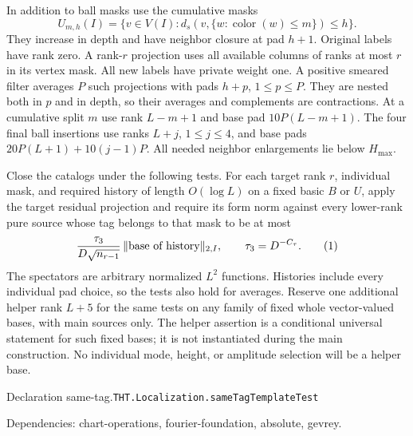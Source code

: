 \documentclass[11pt]{article}
\theoremstyle{definition}
\newcommand{\eqtag}[1]{\refstepcounter{equation}\tag{\theequation}\label{#1}}
\numberwithin{equation}{section}
\newcommand{\bp}[3]{\par\smallskip\begingroup\footnotesize
\noindent\hypertarget{bp:#1}{\textsf{Declaration #1.}}\quad\nolinkurl{#2}\par
\noindent\textsf{Dependencies:} #3.\par\endgroup\smallskip}
\begin{document}
In addition to ball masks use the cumulative masks
\[
 U_{m,h}(I)=\{v\in V(I):d_s(v,\{w:\operatorname{color}(w)\le m\})\le h\}.
\]
They increase in depth and have neighbor closure at pad $h+1$. Original labels have rank zero. A rank-$r$ projection uses all available columns of ranks at most $r$ in its vertex mask. All new labels have private weight one. A positive smeared filter averages $P$ such projections with pads $h+p$, $1\le p\le P$. They are nested both in $p$ and in depth, so their averages and complements are contractions. At a cumulative split $m$ use rank $L-m+1$ and base pad $10P(L-m+1)$. The four final ball insertions use ranks $L+j$, $1\le j\le4$, and base pads $20P(L+1)+10(j-1)P$. All needed neighbor enlargements lie below $H_{\max}$.

Close the catalogs under the following tests. For each target rank $r$, individual mask, and required history of length $O(\log L)$ on a fixed basic $B$ or $U$, apply the target residual projection and require its form norm against every lower-rank pure source whose tag belongs to that mask to be at most
\[
 \frac{\tau_3}{D\sqrt{n_{r-1}}}\,\|\text{base of history}\|_{2,I},
 \qquad \tau_3=D^{-C_\tau}.
 \eqtag{eq:catalog-test}
\]
The spectators are arbitrary normalized $L^2$ functions. Histories include every individual pad choice, so the tests also hold for averages. Reserve one additional helper rank $L+5$ for the same tests on any family of fixed whole vector-valued bases, with main sources only. The helper assertion is a conditional universal statement for such fixed bases; it is not instantiated during the main construction. No individual mode, height, or amplitude selection will be a helper base.

\bp{same-tag}{THT.Localization.sameTagTemplateTest}{chart-operations, fourier-foundation, absolute, gevrey}
\end{document}
